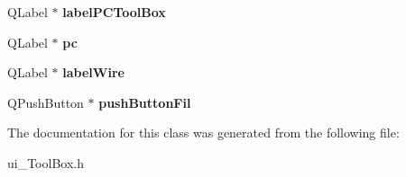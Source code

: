 \begin{DoxyCompactItemize}
\item 
\hypertarget{class_ui___tool_box_a0a3f704fb63859335f980b617e775fe3}{Q\-Label $\ast$ {\bfseries label\-P\-C\-Tool\-Box}}\label{class_ui___tool_box_a0a3f704fb63859335f980b617e775fe3}

\item 
\hypertarget{class_ui___tool_box_a5805239c710128359c86dd47ac59bf4a}{Q\-Label $\ast$ {\bfseries pc}}\label{class_ui___tool_box_a5805239c710128359c86dd47ac59bf4a}

\item 
\hypertarget{class_ui___tool_box_aa7163573d09edda5d16c4390927859ff}{Q\-Label $\ast$ {\bfseries label\-Wire}}\label{class_ui___tool_box_aa7163573d09edda5d16c4390927859ff}

\item 
\hypertarget{class_ui___tool_box_abd0feab1d9a6e187dc9e03c7d383c628}{Q\-Push\-Button $\ast$ {\bfseries push\-Button\-Fil}}\label{class_ui___tool_box_abd0feab1d9a6e187dc9e03c7d383c628}

\end{DoxyCompactItemize}


The documentation for this class was generated from the following file\-:\begin{DoxyCompactItemize}
\item 
ui\-\_\-\-Tool\-Box.\-h\end{DoxyCompactItemize}
